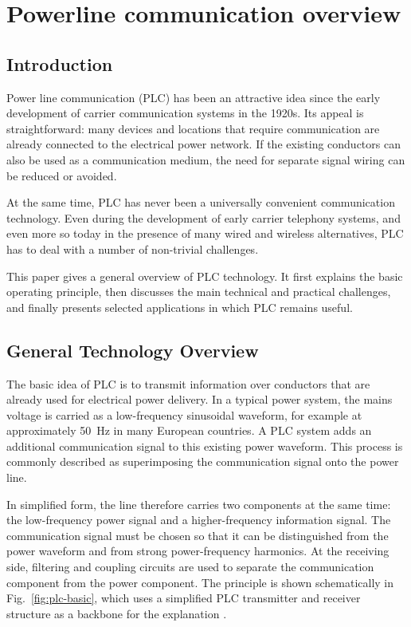 \section{Powerline communication overview}
\label{sec:overview}

\subsection{Introduction}

Power line communication (PLC) has been an attractive idea since the early development of carrier communication systems in the 1920s. Its appeal is straightforward: many devices and locations that require communication are already connected to the electrical power network. If the existing conductors can also be used as a communication medium, the need for separate signal wiring can be reduced or avoided.

At the same time, PLC has never been a universally convenient communication technology. Even during the development of early carrier telephony systems, and even more so today in the presence of many wired and wireless alternatives, PLC has to deal with a number of non-trivial challenges. 

This paper gives a general overview of PLC technology. It first explains the basic operating principle, then discusses the main technical and practical challenges, and finally presents selected applications in which PLC remains useful.

\subsection{General Technology Overview}

The basic idea of PLC is to transmit information over conductors that are already used for electrical power delivery. In a typical power system, the mains voltage is carried as a low-frequency sinusoidal waveform, for example at approximately 50~Hz in many European countries. A PLC system adds an additional communication signal to this existing power waveform. This process is commonly described as superimposing the communication signal onto the power line.

In simplified form, the line therefore carries two components at the same time: the low-frequency power signal and a higher-frequency information signal. The communication signal must be chosen so that it can be distinguished from the power waveform and from strong power-frequency harmonics. At the receiving side, filtering and coupling circuits are used to separate the communication component from the power component. The principle is shown schematically in Fig.~\ref{fig:plc-basic}, which uses a simplified PLC transmitter and receiver structure as a backbone for the explanation \cite{Pandit.2019}.

